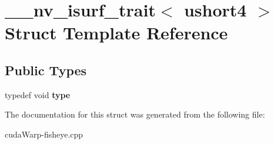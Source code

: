 \hypertarget{struct____nv__isurf__trait_3_01ushort4_01_4}{}\section{\+\_\+\+\_\+nv\+\_\+isurf\+\_\+trait$<$ ushort4 $>$ Struct Template Reference}
\label{struct____nv__isurf__trait_3_01ushort4_01_4}
\subsection*{Public Types}
\begin{DoxyCompactItemize}
\item 
typedef void {\bfseries type}\hypertarget{struct____nv__isurf__trait_3_01ushort4_01_4_affafa978ad90f0d2b715cb0c91f8220b}{}\label{struct____nv__isurf__trait_3_01ushort4_01_4_affafa978ad90f0d2b715cb0c91f8220b}

\end{DoxyCompactItemize}


The documentation for this struct was generated from the following file\+:\begin{DoxyCompactItemize}
\item 
cuda\+Warp-\/fisheye.\+cpp\end{DoxyCompactItemize}

